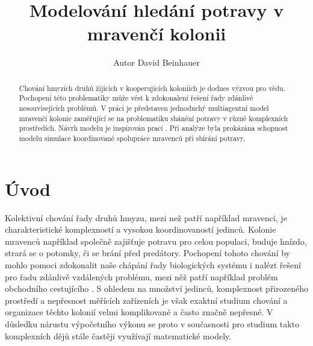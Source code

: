 \documentclass[10pt,a4paper,twocolumn]{article}
\begin{document}
\providecommand{\ShortAuthorList}[0]{David Beinhauer} %
\title{Modelování hledání potravy v mravenčí kolonii}
\author[1]{Autor David Beinhauer}

\date{\dateline{}}

\begin{abstract}
\noindent
Chování hmyzích druhů žijících v kooperujících koloniích je dodnes 
výzvou pro vědu. Pochopení této problematiky může vést k zdokonalení řešení
řady zdánlivě nesouvisejících problémů. V práci je představen jednoduchý
multiagentní model mravenčí kolonie zaměřující se na problematiku shánění
potravy v různě komplexních prostředích. Návrh modelu je inspirován prací 
\citet{jones2010characteristics}. 
Při analýze byla prokázána schopnost modelu simulace koordinované 
spolupráce mravenců při sbírání potravy.

\keywords{}

\DOI{} %
\end{abstract}

\maketitle
\thispagestyle{titlestyle}



\section{Úvod}

Kolektivní chování řady druhů hmyzu, mezi než patří například mravenci,
je charakteristické komplexností a vysokou koordinovaností jedinců. Kolonie
mravenců například společně zajišťuje potravu pro celou populaci, buduje hnízdo,
strará se o potomky, či se brání před predátory. Pochopení tohoto chování by
mohlo pomoci zdokonalit naše chápání řady biologických systému i nalézt
řešení pro řadu zdánlivě vzdálených problému, mezi něž
patří například problém obchodního cestujícího \citet{applegate2011traveling}. 
S ohledem na množství jedinců, komplexnost přirozeného prostředí a 
nepřesnost měřících zařízeních je však exaktní studium chování a 
organizace těchto kolonií velmi komplikované a 
často značně nepřesné. V důsledku nárustu výpočetního výkonu se proto v 
současnosti pro studium takto komplexních dějů stále častěji 
využívají matematické modely. 
\end{document}
